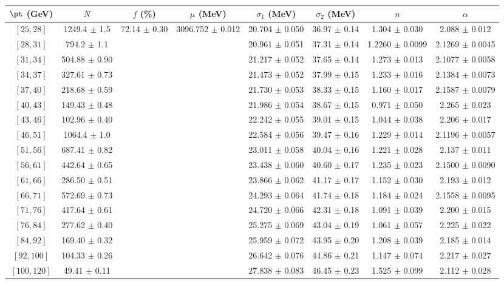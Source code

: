 \begin{tabular}{c||c|c|c|c|c|c|c}
$\pt$ (GeV) & $N$ & $f$ (\%) & $\mu$ (MeV) & $\sigma_1$ (MeV) & $\sigma_2$ (MeV) & $n$ & $\alpha$ \\
\hline
$[25, 28]$ & 1249.4 $\pm$ 1.5 & \multirow{17}{*}{72.14 $\pm$ 0.30} & \multirow{17}{*}{3096.752 $\pm$ 0.012} & 20.704 $\pm$ 0.050 & 36.97 $\pm$ 0.14 & 1.304 $\pm$ 0.030 & 2.088 $\pm$ 0.012\\
$[28, 31]$ & 794.2 $\pm$ 1.1 &  &  & 20.961 $\pm$ 0.051 & 37.31 $\pm$ 0.14 & 1.2260 $\pm$ 0.0099 & 2.1269 $\pm$ 0.0045\\
$[31, 34]$ & 504.88 $\pm$ 0.90 &  &  & 21.217 $\pm$ 0.052 & 37.65 $\pm$ 0.14 & 1.273 $\pm$ 0.013 & 2.1077 $\pm$ 0.0058\\
$[34, 37]$ & 327.61 $\pm$ 0.73 &  &  & 21.473 $\pm$ 0.052 & 37.99 $\pm$ 0.15 & 1.233 $\pm$ 0.016 & 2.1384 $\pm$ 0.0073\\
$[37, 40]$ & 218.68 $\pm$ 0.59 &  &  & 21.730 $\pm$ 0.053 & 38.33 $\pm$ 0.15 & 1.160 $\pm$ 0.017 & 2.1587 $\pm$ 0.0079\\
$[40, 43]$ & 149.43 $\pm$ 0.48 &  &  & 21.986 $\pm$ 0.054 & 38.67 $\pm$ 0.15 & 0.971 $\pm$ 0.050 & 2.265 $\pm$ 0.023\\
$[43, 46]$ & 102.96 $\pm$ 0.40 &  &  & 22.242 $\pm$ 0.055 & 39.01 $\pm$ 0.15 & 1.044 $\pm$ 0.038 & 2.206 $\pm$ 0.017\\
$[46, 51]$ & 1064.4 $\pm$ 1.0 &  &  & 22.584 $\pm$ 0.056 & 39.47 $\pm$ 0.16 & 1.229 $\pm$ 0.014 & 2.1196 $\pm$ 0.0057\\
$[51, 56]$ & 687.41 $\pm$ 0.82 &  &  & 23.011 $\pm$ 0.058 & 40.04 $\pm$ 0.16 & 1.221 $\pm$ 0.028 & 2.137 $\pm$ 0.011\\
$[56, 61]$ & 442.64 $\pm$ 0.65 &  &  & 23.438 $\pm$ 0.060 & 40.60 $\pm$ 0.17 & 1.235 $\pm$ 0.023 & 2.1500 $\pm$ 0.0090\\
$[61, 66]$ & 286.50 $\pm$ 0.51 &  &  & 23.866 $\pm$ 0.062 & 41.17 $\pm$ 0.17 & 1.152 $\pm$ 0.030 & 2.193 $\pm$ 0.012\\
$[66, 71]$ & 572.69 $\pm$ 0.73 &  &  & 24.293 $\pm$ 0.064 & 41.74 $\pm$ 0.18 & 1.184 $\pm$ 0.024 & 2.1558 $\pm$ 0.0095\\
$[71, 76]$ & 417.64 $\pm$ 0.61 &  &  & 24.720 $\pm$ 0.066 & 42.31 $\pm$ 0.18 & 1.091 $\pm$ 0.039 & 2.200 $\pm$ 0.015\\
$[76, 84]$ & 277.62 $\pm$ 0.40 &  &  & 25.275 $\pm$ 0.069 & 43.04 $\pm$ 0.19 & 1.061 $\pm$ 0.057 & 2.225 $\pm$ 0.022\\
$[84, 92]$ & 169.40 $\pm$ 0.32 &  &  & 25.959 $\pm$ 0.072 & 43.95 $\pm$ 0.20 & 1.208 $\pm$ 0.039 & 2.185 $\pm$ 0.014\\
$[92, 100]$ & 104.33 $\pm$ 0.26 &  &  & 26.642 $\pm$ 0.076 & 44.86 $\pm$ 0.21 & 1.147 $\pm$ 0.074 & 2.217 $\pm$ 0.027\\
$[100, 120]$ & 49.41 $\pm$ 0.11 &  &  & 27.838 $\pm$ 0.083 & 46.45 $\pm$ 0.23 & 1.525 $\pm$ 0.099 & 2.112 $\pm$ 0.028\\
\end{tabular}
